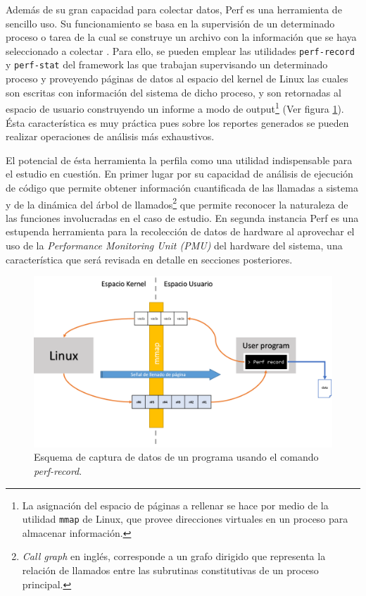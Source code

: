 Además de su gran capacidad para colectar datos, Perf es una herramienta de sencillo uso. Su funcionamiento se basa en la supervisión de un determinado proceso o tarea de la cual se construye un archivo con la información que se haya seleccionado a colectar \cite{article:perf}. Para ello, se pueden emplear las utilidades \verb=perf-record= y \verb=perf-stat= del framework las que trabajan supervisando un determinado proceso y proveyendo páginas de datos al espacio del kernel de Linux las cuales son escritas con información del sistema de dicho proceso, y son retornadas al espacio de usuario construyendo un informe a modo de output\footnote{La asignación del espacio de páginas a rellenar se hace por medio de la utilidad \verb=mmap= de Linux, que provee direcciones virtuales en un proceso para almacenar información.} (Ver figura \ref{fig:perfRecord}). Ésta característica es muy práctica pues sobre los reportes generados se pueden realizar operaciones de análisis más exhaustivos.

El potencial de ésta herramienta la perfila como una utilidad indispensable para el estudio en cuestión. En primer lugar por su capacidad de análisis de ejecución de código que permite obtener información cuantificada de las llamadas a sistema y de la dinámica del árbol de llamados\footnote{\emph{Call graph} en inglés, corresponde a un grafo dirigido que representa la relación de llamados entre las subrutinas constitutivas de un proceso principal.} que permite reconocer la naturaleza de las funciones involucradas en el caso de estudio. En segunda instancia Perf es una estupenda herramienta para la recolección de datos de hardware al aprovechar el uso de la \emph{Performance Monitoring Unit (PMU)} del hardware del sistema, una característica que será revisada en detalle en secciones posteriores.

\begin{figure}[!h]
	\centering
	\includegraphics[scale=.45]{imagenes/perfRecord.png}
	\caption{Esquema de captura de datos de un programa usando el comando \emph{perf-record}.}
	\label{fig:perfRecord}
\end{figure}

